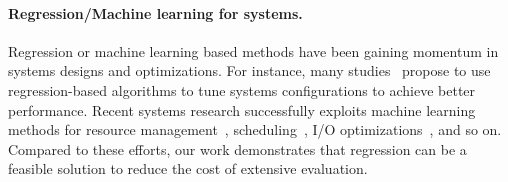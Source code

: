 \vspace{-.1in}
\paragraph{Regression/Machine learning for systems.} 
Regression or machine learning based methods have been gaining momentum in systems designs and optimizations.
For instance, many studies~\cite{yu-dac-asplos18,mr-advisor,rfhoc} propose to use regression-based algorithms to tune systems configurations to achieve better performance. 
Recent systems research successfully exploits machine learning methods for resource management~\cite{Quasar,JouleGuard,LLAMA,CALOREE}, scheduling~\cite{Paragon,Decima}, I/O optimizations~\cite{Vivace,linnos}, and so on.
Compared to these efforts, our work demonstrates that regression can be a feasible solution to reduce the cost of extensive evaluation.


